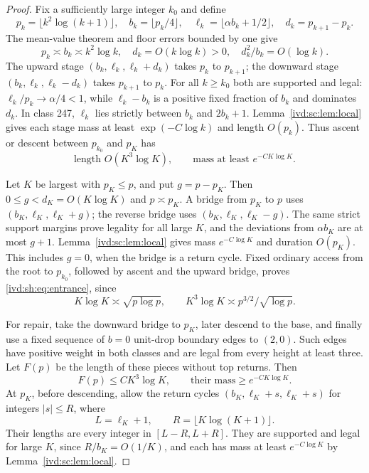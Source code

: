 \documentclass[11pt,letterpaper]{article}
\theoremstyle{remark}\newtheorem{remark}[theorem]{Remark}
\numberwithin{equation}{section}
\begin{document}
\begin{proof}
Fix a sufficiently large integer $k_0$ and define
\begin{equation}\label{ivd:sh:eq:stairs}
 p_k=\lfloor k^2\log(k+1)\rfloor,\quad
 b_k=\lfloor p_k/4\rfloor,\quad
 \ell_k=\lfloor\alpha b_k+1/2\rfloor,\quad
 d_k=p_{k+1}-p_k.
\end{equation}
The mean-value theorem and floor errors bounded by one give
\[
 p_k\asymp b_k\asymp k^2\log k,\quad
 d_k=O(k\log k)>0,\quad d_k^2/b_k=O(\log k).
\]
The upward stage $(b_k,\ell_k,\ell_k+d_k)$ takes $p_k$ to
$p_{k+1}$; the downward stage $(b_k,\ell_k,\ell_k-d_k)$ takes
$p_{k+1}$ to $p_k$. For all $k\ge k_0$ both are supported and legal:
$\ell_k/p_k\to\alpha/4<1$, while $\ell_k-b_k$ is a positive
fixed fraction of $b_k$ and dominates $d_k$. In class 247,
$\ell_k$ lies strictly between $b_k$ and $2b_k+1$.
Lemma~\ref{ivd:sc:lem:local} gives each stage mass at least
$\exp(-C\log k)$ and length $O(p_k)$.
Thus ascent or descent between $p_{k_0}$ and $p_K$ has
\begin{equation}\label{ivd:sh:eq:staircost}
 \text{length }O(K^3\log K),\qquad
 \text{mass at least }e^{-CK\log K}.
\end{equation}

Let $K$ be largest with $p_K\le p$, and put $g=p-p_K$.
Then $0\le g<d_K=O(K\log K)$ and $p\asymp p_K$.
A bridge from $p_K$ to $p$ uses
$(b_K,\ell_K,\ell_K+g)$; the reverse bridge uses
$(b_K,\ell_K,\ell_K-g)$.
The same strict support margins prove legality for all large $K$,
and the deviations from $\alpha b_K$ are at most $g+1$.
Lemma~\ref{ivd:sc:lem:local} gives mass $e^{-C\log K}$ and duration
$O(p_K)$. This includes $g=0$, when the bridge is a return cycle.
Fixed ordinary access from the root to $p_{k_0}$, followed by ascent
and the upward bridge, proves \eqref{ivd:sh:eq:entrance}, since
\begin{equation}\label{ivd:sh:eq:Kscale}
 K\log K\asymp\sqrt{p\log p},\qquad
 K^3\log K\asymp p^{3/2}/\sqrt{\log p}.
\end{equation}

For repair, take the downward bridge to $p_K$, later descend to the
base, and finally use a fixed sequence of $b=0$ unit-drop boundary
edges to $(2,0)$. Such edges have positive weight in both classes
and are legal from every height at least three.
Let $F(p)$ be the length of these pieces without top returns. Then
\[
 F(p)\le CK^3\log K,\qquad
 \text{their mass}\ge e^{-CK\log K}.
\]
At $p_K$, before descending, allow the return cycles
$(b_K,\ell_K+s,\ell_K+s)$ for integers $|s|\le R$, where
\[
 L=\ell_K+1,\qquad R=\lfloor K\log(K+1)\rfloor.
\]
Their lengths are every integer in $[L-R,L+R]$. They are supported
and legal for large $K$, since $R/b_K=O(1/K)$, and each has mass
at least $e^{-C\log K}$ by Lemma~\ref{ivd:sc:lem:local}.


\end{proof}
\end{document}
